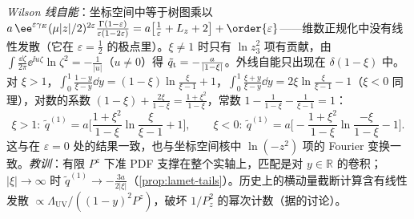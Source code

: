 \begin{example}
\emph{Wilson 线自能}：坐标空间中等于树图乘以 $a\,\ee^{\varepsilon\gamma_E}(\mu|z|/2)^{2\varepsilon}\frac{\Gamma(1-\varepsilon)}{\varepsilon(1-2\varepsilon)}=a\big[\frac1\varepsilon+L_z+2\big]+\order{\varepsilon}$——维数正规化中没有线性发散（它在 $\varepsilon=\frac12$ 的极点里）。$\xi\neq1$ 时只有 $\ln z_3^2$ 项有贡献，由 $\int\frac{\dd\zeta}{2\pi}\ee^{\ii u\zeta}\ln\zeta^2=-\frac1{|u|}$（$u\neq0$）得 $\tilde q_{\rm t}=-\frac a{|1-\xi|}$。外线自能只出现在 $\delta(1-\xi)$ 中。
对 $\xi>1$，$\int_0^1\frac{1-y}{\xi-y}\dd y=(1-\xi)\ln\frac\xi{\xi-1}+1$，$\int_0^1\frac{\xi+y}{\xi-y}\dd y=2\xi\ln\frac\xi{\xi-1}-1$（$\xi<0$ 同理），对数的系数 $(1-\xi)+\frac{2\xi}{1-\xi}=\frac{1+\xi^2}{1-\xi}$，常数 $1-\frac1{1-\xi}-\frac1{\xi-1}=1$：
\begin{equation}\label{eq:lamet-unphysical}
\xi>1:\ \tilde q^{(1)}=a\Big[\frac{1+\xi^2}{1-\xi}\ln\frac{\xi}{\xi-1}+1\Big],\qquad
\xi<0:\ \tilde q^{(1)}=a\Big[-\frac{1+\xi^2}{1-\xi}\ln\frac{-\xi}{1-\xi}-1\Big].
\end{equation}%
这与\cite[附录~B]{IzubuchiEtAl2018}在 $\varepsilon=0$ 处的结果一致，也与坐标空间核中 $\ln(-z^2)$ 项的 Fourier 变换一致。\emph{教训}：有限 $P^z$ 下准 PDF 支撑在整个实轴上，匹配是对 $y\in\mathbb R$ 的卷积；$|\xi|\to\infty$ 时 $\tilde q^{(1)}\to-\frac{3a}{2|\xi|}$（\cref{prop:lamet-tails}）。历史上的横动量截断计算\cite{XiongEtAl2014}含有线性发散 $\propto\Lambda_{\mathrm{UV}}/((1-y)^2P^z)$，破坏 $1/P_z^2$ 的幂次计数（据\cite{JiEtAl2021}的讨论）。
\end{example}
